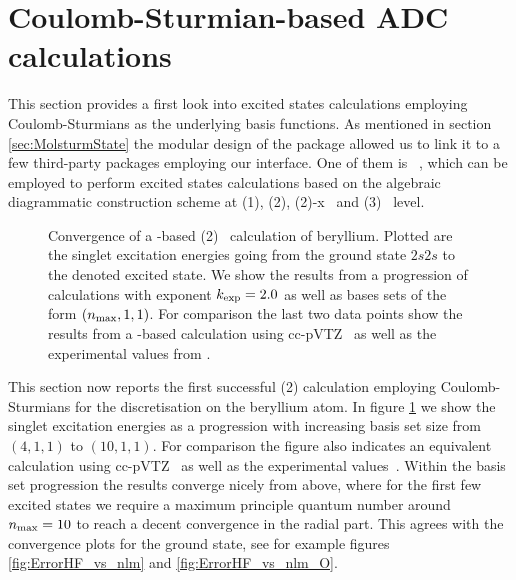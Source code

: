\section{Coulomb-Sturmian-based ADC calculations}
\label{sec:SturmianADC}
This section provides a first look into excited states calculations
employing Coulomb-Sturmians as the underlying basis functions.
As mentioned in section \vref{sec:MolsturmState} the modular design
of the \molsturm package allowed us to link it to a few third-party
packages employing our \python interface.
One of them is \adcman~\cite{Wormit2014},
which can be employed to perform excited states calculations
based on the algebraic diagrammatic construction scheme at
{\ADC}(1), {\ADC}(2), {\ADC}(2)-x~\cite{Schirmer1982}
and {\ADC}(3)~\cite{Trofimov1999} level.

\begin{figure}
	\centering
	\caption[
		Convergence of a \CS-based {\ADC}(2) calculation of beryllium
	]{
		Convergence of a \CS-based {\ADC}(2)~\cite{Schirmer1982}
		calculation of beryllium.
		Plotted are the singlet excitation energies
		going from the ground state $2s2s$ to the denoted excited state.
		We show the results from a progression
		of \CS calculations with exponent $k_\text{exp} = 2.0$
		as well as bases sets of the form $(n_\text{max}, 1, 1)$.
		For comparison the last two data points
		show the results from a \cGTO-based calculation
		using cc-pVTZ~\cite{Prascher2011}
		as well as the experimental values from \citet{Moore1949}.
	}
	\label{fig:SturmianAdcResults}
\end{figure}
This section now reports the first successful {\ADC}(2)
calculation employing Coulomb-Sturmians for the discretisation
on the beryllium atom.
In figure \ref{fig:SturmianAdcResults} we show the singlet excitation energies
as a progression with increasing \CS basis set size from $(4,1,1)$ to $(10,1,1)$.
For comparison the figure also indicates an equivalent calculation
using cc-pVTZ~\cite{Prascher2011} as well as the experimental values~\cite{Moore1949}.
Within the \CS basis set progression the results converge nicely from above,
where for the first few excited states we require
a maximum principle quantum number around $n_\text{max} = 10$
to reach a decent convergence in the radial part.
This agrees with the convergence plots for the ground state,
see for example figures \vref{fig:ErrorHF_vs_nlm} and \vref{fig:ErrorHF_vs_nlm_O}.

